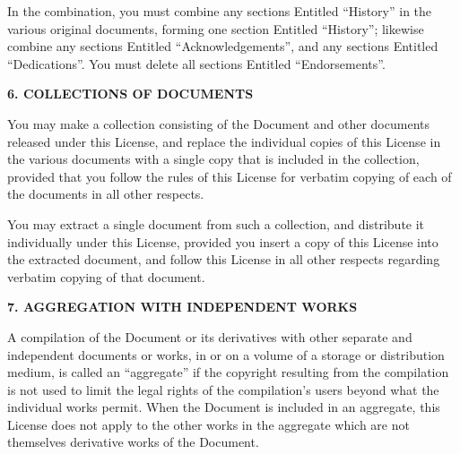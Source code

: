 \ifdefined\chs

\fi

\ifdefined\eng
In the combination, you must combine any sections Entitled ``History''
in the various original documents, forming one section Entitled
``History''; likewise combine any sections Entitled ``Acknowledgements'',
and any sections Entitled ``Dedications''.  You must delete all sections
Entitled ``Endorsements''.
\fi

\ifdefined\chs

\fi

\ifdefined\eng
\begin{center}
{\Large\bf 6. COLLECTIONS OF DOCUMENTS\par}
\end{center}
\fi

\ifdefined\chs

\fi

\ifdefined\eng
You may make a collection consisting of the Document and other documents
released under this License, and replace the individual copies of this
License in the various documents with a single copy that is included in
the collection, provided that you follow the rules of this License for
verbatim copying of each of the documents in all other respects.
\fi

\ifdefined\chs

\fi

\ifdefined\eng
You may extract a single document from such a collection, and distribute
it individually under this License, provided you insert a copy of this
License into the extracted document, and follow this License in all
other respects regarding verbatim copying of that document.
\fi

\ifdefined\chs

\fi

\ifdefined\eng
\fi

\ifdefined\chs

\fi

\ifdefined\eng
\begin{center}
{\Large\bf 7. AGGREGATION WITH INDEPENDENT WORKS\par}
\end{center}
\fi

\ifdefined\chs

\fi

\ifdefined\eng
\fi

\ifdefined\chs

\fi

\ifdefined\eng
A compilation of the Document or its derivatives with other separate
and independent documents or works, in or on a volume of a storage or
distribution medium, is called an ``aggregate'' if the copyright
resulting from the compilation is not used to limit the legal rights
of the compilation's users beyond what the individual works permit.
When the Document is included in an aggregate, this License does not
apply to the other works in the aggregate which are not themselves
derivative works of the Document.
\fi

